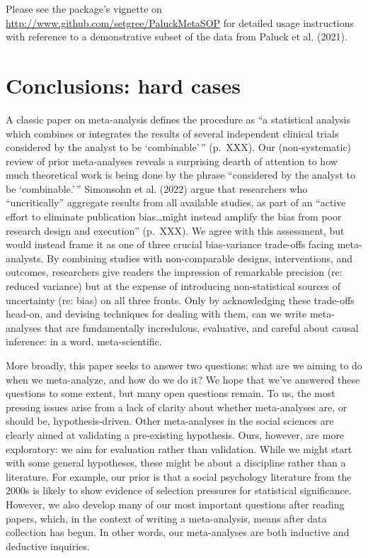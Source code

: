 \documentclass[
  ,jou]{apa6}
\begin{document}
Please see the package's vignette on \url{http://www.github.com/setgree/PaluckMetaSOP} for detailed usage instructions with reference to a demonstrative subset of the data from Paluck et al. (2021).

\section{Conclusions: hard cases}\label{conclusions-hard-cases}

A classic paper on meta-analysis defines the procedure as ``a statistical analysis which combines or integrates the results of several independent clinical trials considered by the analyst to be `combinable'\,'' (p.~XXX). Our (non-systematic) review of prior meta-analyses reveals a surprising dearth of attention to how much theoretical work is being done by the phrase ``considered by the analyst to be `combinable.'\,'' Simonsohn et al. (2022) argue that researchers who ``uncritically'' aggregate results from all available studies, as part of an ``active effort to eliminate publication bias\ldots might instead amplify the bias from poor research design and execution'' (p.~XXX). We agree with this assessment, but would instead frame it as one of three crucial bias-variance trade-offs facing meta-analysts. By combining studies with non-comparable designs, interventions, and outcomes, researchers give readers the impression of remarkable precision (re: reduced variance) but at the expense of introducing non-statistical sources of uncertainty (re: bias) on all three fronts. Only by acknowledging these trade-offs head-on, and devising techniques for dealing with them, can we write meta-analyses that are fundamentally incredulous, evaluative, and careful about causal inference: in a word, meta-scientific.

More broadly, this paper seeks to answer two questions: what are we aiming to do when we meta-analyze, and how do we do it? We hope that we've answered these questions to some extent, but many open questions remain. To us, the most pressing issues arise from a lack of clarity about whether meta-analyses are, or should be, hypothesis-driven. Other meta-analyses in the social sciences are clearly aimed at validating a pre-existing hypothesis. Ours, however, are more exploratory: we aim for evaluation rather than validation. While we might start with some general hypotheses, these might be about a discipline rather than a literature. For example, our prior is that a social psychology literature from the 2000s is likely to show evidence of selection pressures for statistical significance. However, we also develop many of our most important questions after reading papers, which, in the context of writing a meta-analysis, means after data collection has begun. In other words, our meta-analyses are both inductive and deductive inquiries.
\end{document}
